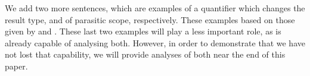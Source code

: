 \documentclass[10pt,a4paper]{llncs}
\begin{document}
We add two more sentences, which are examples of a quantifier which
changes the result type, and of parasitic scope, respectively. These
examples based on those given by  and
\citet{kiselyov2015b}.
These last two examples will play a less important role, as {\NLCL} is
already capable of analysing both. However, in order to demonstrate
that we have not lost that capability, we will provide analyses of
both near the end of this paper.
\end{document}
